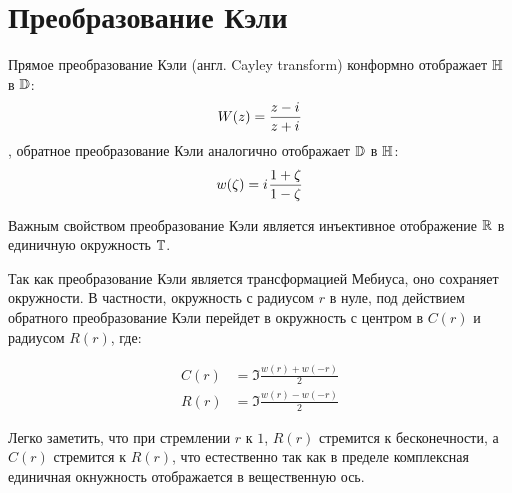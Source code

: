 
\section{Преобразование Кэли}

Прямое преобразование Кэли (англ. Cayley transform) конформно отображает $\mathbb{H}$ в $\mathbb{D}$:
\begin{equation}\label{eq:cayley}
W(z) = \frac{z - {i\mkern1mu}}{z + {i\mkern1mu}}
\end{equation}
, обратное преобразование Кэли аналогично отображает $\mathbb{D}$ в $\mathbb{H}$:
\begin{equation}\label{eq:cayley_inverse}
w(\zeta) = {i\mkern1mu} \frac{1 + \zeta}{1 - \zeta}
\end{equation}

Важным свойством преобразование Кэли является инъективное отображение $\mathbb{R}$ в единичную окружность $\mathbb{T}$.

Так как преобразование Кэли является трансформацией Мебиуса, оно сохраняет окружности. В частности, окружность с радиусом $r$ в нуле, под действием обратного преобразование Кэли перейдет в окружность с центром в $C(r)$ и радиусом $R(r)$, где:

\begin{equation}\label{eq:c_and_r}
\begin{aligned}
   C(r) &= \Im \frac{w(r) + w(-r)}{2}
\\ R(r) &= \Im \frac{w(r) - w(-r)}{2}
\end{aligned}
\end{equation}

Легко заметить, что при стремлении $r$ к $1$, $R(r)$ стремится к бесконечности, а $C(r)$ стремится к $R(r)$, что естественно так как в пределе комплексная единичная окнужность отображается в вещественную ось.

